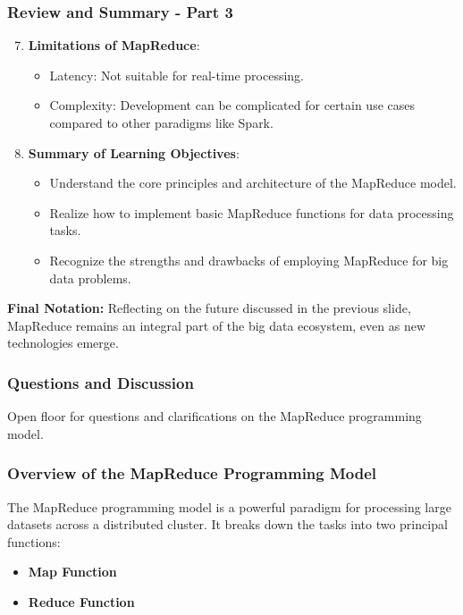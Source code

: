 \documentclass[aspectratio=169]{beamer}
\begin{document}
\begin{frame}[fragile]
    \frametitle{Review and Summary - Part 3}
    \begin{enumerate}
        \setcounter{enumii}{6}
        \item \textbf{Limitations of MapReduce}:
        \begin{itemize}
            \item Latency: Not suitable for real-time processing.
            \item Complexity: Development can be complicated for certain use cases compared to other paradigms like Spark.
        \end{itemize}
        
        \item \textbf{Summary of Learning Objectives}:
        \begin{itemize}
            \item Understand the core principles and architecture of the MapReduce model.
            \item Realize how to implement basic MapReduce functions for data processing tasks.
            \item Recognize the strengths and drawbacks of employing MapReduce for big data problems.
        \end{itemize}
    \end{enumerate}
    \textbf{Final Notation:}  
    Reflecting on the future discussed in the previous slide, MapReduce remains an integral part of the big data ecosystem, even as new technologies emerge.
\end{frame}

\begin{frame}[fragile]
    \frametitle{Questions and Discussion}
    Open floor for questions and clarifications on the MapReduce programming model.
\end{frame}

\begin{frame}[fragile]
    \frametitle{Overview of the MapReduce Programming Model}
    The MapReduce programming model is a powerful paradigm for processing large datasets across a distributed cluster. It breaks down the tasks into two principal functions: 
    \begin{itemize}
        \item \textbf{Map Function}
        \item \textbf{Reduce Function}
    \end{itemize}
\end{frame}
\end{document}
